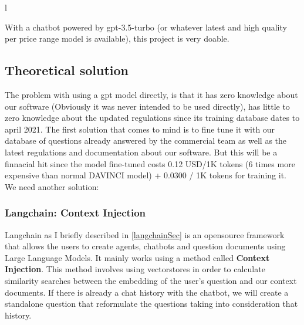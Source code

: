 l\documentclass[a4paper,12pt,twoside]{report}
\begin{document}
With a chatbot powered by gpt-3.5-turbo (or whatever latest and high quality per price range model is available), this project is very doable.
\subsection{Theoretical solution}
The problem with using a gpt model directly, is that it has zero knowledge about our software (Obviously it was never intended to be used directly), has little to zero knowledge about the updated regulations since its training database dates to april 2021. 
The first solution that comes to mind is to fine tune it with our database of questions already answered by the commercial team as well as the latest regulations and documentation about our software. But this will be a finnacial hit since the model fine-tuned costs 0.12 USD/1K tokens (6 times more expensive than normal DAVINCI model) + 0.0300 / 1K tokens for training it. We need another solution:
\subsubsection{Langchain: Context Injection}
Langchain as I briefly described in \ref{langchainSec} is an opensource framework that allows the users to create agents, chatbots and question documents using Large Language Models. It mainly works using a method called \textbf{Context Injection}. This method involves using vectorstores in order to calculate similarity searches between the embedding of the user's question and our context documents. If there is already a chat history with the chatbot, we will create a standalone question that reformulate the questions taking into consideration that history.
\end{document}
